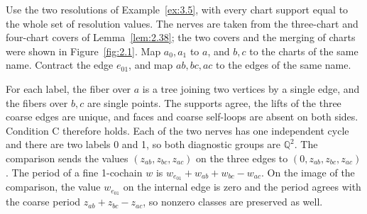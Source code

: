 \begin{example}\label{ex:3.18}

Use the two resolutions of Example~\ref{ex:3.5}, with every chart support equal to
the whole set of resolution values.
The nerves are taken from the three-chart and four-chart covers of
Lemma~\ref{lem:2.38}; the two covers and the merging of charts were shown in
Figure~\ref{fig:2.1}.
Map $a_0,a_1$ to $a$, and $b,c$ to the charts of the same name.
Contract the edge $e_{01}$, and map $ab,bc,ac$ to the edges of the same name.

For each label, the fiber over $a$ is a tree joining two vertices by a single edge,
and the fibers over $b,c$ are single points.
The supports agree, the lifts of the three coarse edges are unique, and faces and
coarse self-loops are absent on both sides.
Condition C therefore holds.
Each of the two nerves has one independent cycle and there are two labels 0 and 1,
so both diagnostic groups are $\mathbb{Q}^2$.
The comparison sends the values $(z_{ab},z_{bc},z_{ac})$ on the three edges to
$(0,z_{ab},z_{bc},z_{ac})$.
The period of a fine 1-cochain $w$ is
$w_{e_{01}}+w_{ab}+w_{bc}-w_{ac}$.
On the image of the comparison, the value $w_{e_{01}}$ on the internal edge is zero
and the period agrees with the coarse period $z_{ab}+z_{bc}-z_{ac}$, so nonzero
classes are preserved as well.

\end{example}

